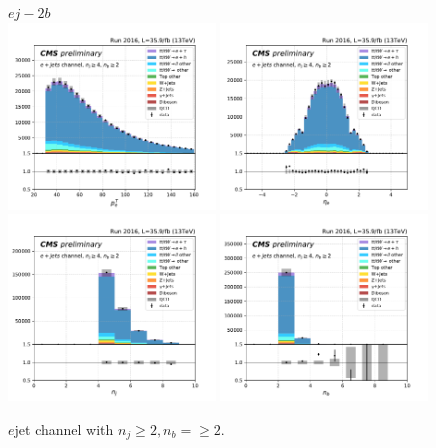 \begin{figure}[ht]
    \centering
    $e j - 2b$ \\
    \includegraphics[width=0.49\textwidth]{chapters/Analysis/sectionPlots/figures/kinematics_pickles/e4j/2b/e4j_2b_lepton1_pt.pdf}
    \includegraphics[width=0.49\textwidth]{chapters/Analysis/sectionPlots/figures/kinematics_pickles/e4j/2b/e4j_2b_lepton1_eta.pdf}
    \includegraphics[width=0.49\textwidth]{chapters/Analysis/sectionPlots/figures/kinematics_pickles/e4j/2b/e4j_2b_nJets.pdf}
    \includegraphics[width=0.49\textwidth]{chapters/Analysis/sectionPlots/figures/kinematics_pickles/e4j/2b/e4j_2b_nBJets.pdf}
    
    \caption{$e$jet channel with $n_j\geq2, n_b=\geq2$.}
\end{figure}
